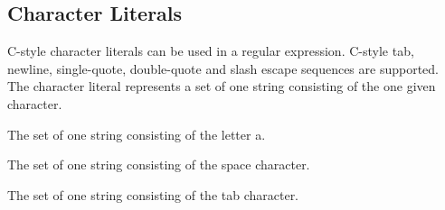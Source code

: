 
\subsection{Character Literals}
{
	C-style character literals can be used in a regular expression.
	C-style tab, newline, single-quote, double-quote and slash escape sequences
	are supported.
	The character literal represents a set of one string consisting of the one
	given character.
	
	\begin{itemize}
	{
		\item[\texttt{`a'}] The set of one string consisting of the letter a.
		
		\item[\texttt{` '}] The set of one string consisting of the space character.
		
		\item[\texttt{`\symbol{92}t'}] The set of one string consisting of the
			tab character.
	}
	\end{itemize}
}
